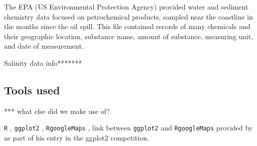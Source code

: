 \documentclass[authoryear,12pt]{elsarticle}
\begin{document}
The EPA (US Environmental  Protection Agency) provided water and sediment chemistry data focused on petrochemical products, sampled near the coastline in the months since the oil spill. This file contained records of many chemicals and their geographic location, substance name, amount of substance, measuring unit, and date of measurement. 

Salinity data info*******

\subsection{Tools used}
*** what else did we make use of?

{\tt R} \citep{R2011}, {\tt ggplot2} \citep{ggplot2}, {\tt RgoogleMaps} \citep{RgoogleMaps}, link between {\tt ggplot2} and {\tt RgoogleMaps} provided by \citet{kahle2010} as part of his entry in the ggplot2 competition.
\end{document}
